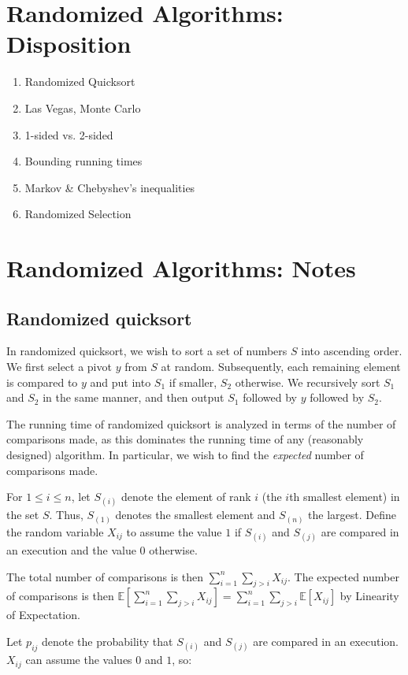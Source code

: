 \section{Randomized Algorithms: Disposition}
\begin{enumerate}
	\item Randomized Quicksort
	\item Las Vegas, Monte Carlo
	\item 1-sided vs. 2-sided
	\item Bounding running times
	\item Markov \& Chebyshev's inequalities
	\item Randomized Selection
\end{enumerate}

\section{Randomized Algorithms: Notes}

\subsection{Randomized quicksort}
In randomized quicksort, we wish to sort a set of numbers $S$ into ascending
order. We first select a pivot $y$ from $S$ at random. Subsequently, each
remaining element is compared to $y$ and put into $S_1$ if smaller, $S_2$
otherwise. We recursively sort $S_1$ and $S_2$ in the same manner, and then
output $S_1$ followed by $y$ followed by $S_2$.

The running time of randomized quicksort is analyzed in terms of the number of
comparisons made, as this dominates the running time of any (reasonably designed)
algorithm. In particular, we wish to find the \textit{expected} number of comparisons
made.

For $1 \leq i \leq n$, let $S_{(i)}$ denote the element of rank $i$ (the $i$th smallest element)
in the set $S$. Thus, $S_{(1)}$ denotes the smallest element and $S_{(n)}$ the largest. Define the
random variable $X_{ij}$ to assume the value $1$ if $S_{(i)}$ and $S_{(j)}$ are compared in an execution
and the value $0$ otherwise.

The total number of comparisons is then $\sum_{i=1}^n \sum_{j>i} X_{ij}$. The expected number of comparisons is
then $\mathbb{E}[\sum_{i=1}^n \sum_{j>i} X_{ij}] = \sum_{i=1}^n \sum_{j>i} \mathbb{E}[X_{ij}]$ by Linearity
of Expectation.

Let $p_{ij}$ denote the probability that $S_{(i)}$ and $S_{(j)}$ are compared in an execution. $X_{ij}$ can
assume the values $0$ and $1$, so:

